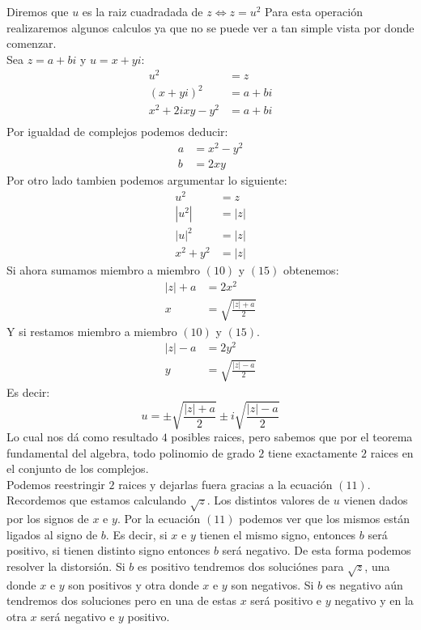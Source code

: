 \documentclass[]{article}
\begin{document}
Diremos que $u$ es la raiz cuadradada de $z \Leftrightarrow z = u^{2}$  
Para esta operación realizaremos algunos calculos ya que no se puede ver a tan simple vista por donde comenzar.
\\
Sea $z = a+bi$ y $u = x + yi$:
\begin{align}
  u^{2}&= z\\
  (x+yi)^{2}&= a+bi\\
 x^{2}+2ixy-y^{2} &=a+bi\\
\end{align}
Por igualdad de complejos podemos deducir:
\begin{align}
  a &= x^{2} - y^{2}\\
  b &=2xy 
\end{align}
Por otro lado tambien podemos argumentar lo siguiente:
\begin{align}
  u^{2}&=z\\
  |u^{2}| &= |z|\\
  |u|^{2} &= |z|\\
  x^{2}+y^{2} &= |z| 
\end{align}
Si ahora sumamos miembro a miembro $(10)$ y $(15)$ obtenemos:
\begin{align}
  |z| + a &= 2x^{2}\\
  x &= \sqrt{\frac{|z|+a}{2}}  
\end{align}
Y si restamos miembro a miembro $(10)$ y $(15)$.
\begin{align}
|z| - a &= 2y^{2}\\
y &= \sqrt{\frac{|z|-a}{2}}  
\end{align}
Es decir: 
$$
u = \pm\sqrt{\frac{|z|+a}{2}}  \pm i\sqrt{\frac{|z|-a}{2}}   
$$
Lo cual nos dá como resultado $4$ posibles raices, pero sabemos que por el teorema fundamental del algebra, todo polinomio de grado $2$ tiene exactamente $2$ raices en el conjunto de los complejos.
\\ 
Podemos reestringir $2$ raices y dejarlas fuera gracias a la ecuación $(11)$. Recordemos que estamos calculando $\sqrt{z}$.
Los distintos valores de $u$ vienen dados por los signos de $x$ e $y$. Por la ecuación $(11)$ podemos ver que los mismos están ligados al signo de $b$. Es decir, si $x$ e $y$ tienen el mismo signo, entonces $b$ será positivo, si tienen distinto signo entonces $b$ será negativo. De esta forma podemos resolver la distorsión. Si $b$ es positivo tendremos dos soluciónes para $\sqrt{z}$, una donde $x$ e $y$ son positivos y otra donde $x$ e $y$ son negativos. Si $b$ es negativo aún tendremos dos soluciones pero en una de estas $x$ será positivo e $y$ negativo y en la otra $x$ será negativo e $y$ positivo.
\\
\end{document}
